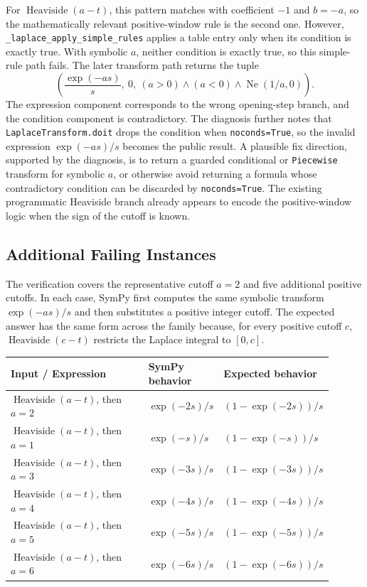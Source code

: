 \documentclass[11pt]{article}
\begin{document}
For \(\operatorname{Heaviside}(a-t)\), this pattern matches with coefficient
\(-1\) and \(b=-a\), so the mathematically relevant positive-window rule is the
second one.  However, \texttt{\_laplace\_apply\_simple\_rules} applies a table
entry only when its condition is exactly true.  With symbolic \(a\), neither
condition is exactly true, so this simple-rule path fails.  The later transform
path returns the tuple
\[
  \left(\frac{\exp(-as)}{s},\ 0,\ (a>0)\wedge(a<0)\wedge\operatorname{Ne}(1/a,0)\right).
\]
The expression component corresponds to the wrong opening-step branch, and the
condition component is contradictory.  The diagnosis further notes that
\texttt{LaplaceTransform.doit} drops the condition when \texttt{noconds=True},
so the invalid expression \(\exp(-as)/s\) becomes the public result.  A plausible
fix direction, supported by the diagnosis, is to return a guarded conditional or
\texttt{Piecewise} transform for symbolic \(a\), or otherwise avoid returning a
formula whose contradictory condition can be discarded by \texttt{noconds=True}.
The existing programmatic Heaviside branch already appears to encode the
positive-window logic when the sign of the cutoff is known.

\subsection{Additional Failing Instances}

The verification covers the representative cutoff \(a=2\) and five additional
positive cutoffs.  In each case, SymPy first computes the same symbolic transform
\(\exp(-as)/s\) and then substitutes a positive integer cutoff.  The expected
answer has the same form across the family because, for every positive cutoff
\(c\), \(\operatorname{Heaviside}(c-t)\) restricts the Laplace integral to
\([0,c]\).

\begin{center}
\small
\renewcommand{\arraystretch}{1.3}
\begin{tabular}{@{}>{\raggedright\arraybackslash}p{0.44\linewidth}>{\raggedright\arraybackslash}p{0.23\linewidth}>{\raggedright\arraybackslash}p{0.23\linewidth}@{}}
\toprule
\textbf{Input / Expression} & \textbf{SymPy behavior} & \textbf{Expected behavior} \\
\midrule
\(\operatorname{Heaviside}(a-t)\), then \(a=2\) & \(\exp(-2s)/s\) & \((1-\exp(-2s))/s\) \\
\(\operatorname{Heaviside}(a-t)\), then \(a=1\) & \(\exp(-s)/s\) & \((1-\exp(-s))/s\) \\
\(\operatorname{Heaviside}(a-t)\), then \(a=3\) & \(\exp(-3s)/s\) & \((1-\exp(-3s))/s\) \\
\(\operatorname{Heaviside}(a-t)\), then \(a=4\) & \(\exp(-4s)/s\) & \((1-\exp(-4s))/s\) \\
\(\operatorname{Heaviside}(a-t)\), then \(a=5\) & \(\exp(-5s)/s\) & \((1-\exp(-5s))/s\) \\
\(\operatorname{Heaviside}(a-t)\), then \(a=6\) & \(\exp(-6s)/s\) & \((1-\exp(-6s))/s\) \\
\bottomrule
\end{tabular}
\end{center}
\end{document}
